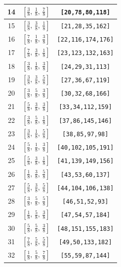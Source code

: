 \documentclass[fleqn,8pt]{jsarticle}
\begin{document}
\begin{longtable}{ccc}
14 & $\left[ \frac{3}{8},\, \frac{1}{8},\, \frac{7}{8} \right]$ & {\tt [20,78,80,118]} \\ \hline
15 & $\left[ \frac{3}{8},\, \frac{3}{8},\, \frac{1}{8} \right]$ & {\tt [21,28,35,162]} \\ \hline
16 & $\left[ \frac{7}{8},\, \frac{1}{8},\, \frac{3}{8} \right]$ & {\tt [22,116,174,176]} \\ \hline
17 & $\left[ \frac{7}{8},\, \frac{3}{8},\, \frac{1}{8} \right]$ & {\tt [23,123,132,163]} \\ \hline
18 & $\left[ \frac{3}{8},\, \frac{1}{8},\, \frac{3}{8} \right]$ & {\tt [24,29,31,113]} \\ \hline
19 & $\left[ \frac{3}{8},\, \frac{3}{8},\, \frac{5}{8} \right]$ & {\tt [27,36,67,119]} \\ \hline
20 & $\left[ \frac{3}{8},\, \frac{5}{8},\, \frac{3}{8} \right]$ & {\tt [30,32,68,166]} \\ \hline
21 & $\left[ \frac{5}{8},\, \frac{3}{8},\, \frac{3}{8} \right]$ & {\tt [33,34,112,159]} \\ \hline
22 & $\left[ \frac{3}{8},\, \frac{5}{8},\, \frac{1}{8} \right]$ & {\tt [37,86,145,146]} \\ \hline
23 & $\left[ \frac{3}{8},\, \frac{1}{8},\, \frac{5}{8} \right]$ & {\tt [38,85,97,98]} \\ \hline
24 & $\left[ \frac{5}{8},\, \frac{1}{8},\, \frac{3}{8} \right]$ & {\tt [40,102,105,191]} \\ \hline
25 & $\left[ \frac{5}{8},\, \frac{3}{8},\, \frac{1}{8} \right]$ & {\tt [41,139,149,156]} \\ \hline
26 & $\left[ \frac{1}{8},\, \frac{3}{8},\, \frac{5}{8} \right]$ & {\tt [43,53,60,137]} \\ \hline
27 & $\left[ \frac{5}{8},\, \frac{3}{8},\, \frac{5}{8} \right]$ & {\tt [44,104,106,138]} \\ \hline
28 & $\left[ \frac{3}{8},\, \frac{5}{8},\, \frac{5}{8} \right]$ & {\tt [46,51,52,93]} \\ \hline
29 & $\left[ \frac{1}{8},\, \frac{5}{8},\, \frac{3}{8} \right]$ & {\tt [47,54,57,184]} \\ \hline
30 & $\left[ \frac{5}{8},\, \frac{5}{8},\, \frac{3}{8} \right]$ & {\tt [48,151,155,183]} \\ \hline
31 & $\left[ \frac{7}{8},\, \frac{5}{8},\, \frac{5}{8} \right]$ & {\tt [49,50,133,182]} \\ \hline
32 & $\left[ \frac{1}{8},\, \frac{5}{8},\, \frac{7}{8} \right]$ & {\tt [55,59,87,144]} \\ \hline

\end{longtable}
\end{document}
